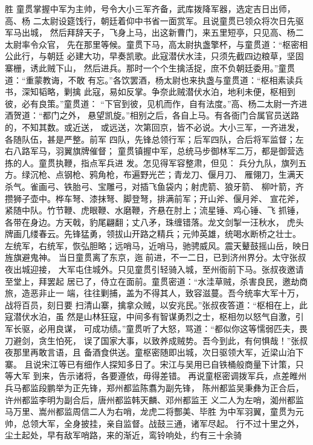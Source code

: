 胜
童贯掌握中军为主帅，号令大小三军齐备，武库拨降军器，选定吉日出师，高、杨
二太尉设筵饯行，朝廷着仰中书省一面赏军。且说童贯已领众将次日先驱军马出城，
然后拜辞天子，飞身上马，出这新曹门，来五里短亭，只见高、杨二太尉率令众官，
先在那里等候。童贯下马，高太尉执盏擎杯，与童贯道：“枢密相公此行，与朝廷
必建大功，早奏凯歌。此寇潜伏水洼，只须先截四边粮草，坚固寨栅，诱此贼下山，
然后进兵。那时一个个生擒活捉，庶不负朝廷委用。”童贯道：“重蒙教诲，不敢
有忘。”各饮罢酒，杨太尉也来执盏与童贯道：“枢相素读兵书，深知韬略，剿擒
此寇，易如反掌。争奈此贼潜伏水泊，地利未便，枢相到彼，必有良策。”童贯道：
“下官到彼，见机而作，自有法度。”高、杨二太尉一齐进酒贺道：“都门之外，
悬望凯旋。”相别之后，各自上马。有各衙门合属官员送路的，不知其数。或近送，
或远送，次第回京，皆不必说。大小三军，一齐进发，各随队伍，甚是严整。前军
四队，先锋总领行军；后军四队，合后将军监督；左右八路军马，羽翼旗牌催督；
童贯镇握中军，总统马步御林军二万，都是御营选拣的人。童贯执鞭，指点军兵进
发。怎见得军容整肃，但见：
兵分九队，旗列五方。绿沉枪、点钢枪、鸦角枪，布遍野光芒；青龙刀、偃月刀、
雁翎刀，生满天杀气。雀画弓、铁胎弓、宝雕弓，对插飞鱼袋内；射虎箭、狼牙箭、
柳叶箭，齐攒狮子壶中。桦车弩、漆抹弩、脚登弩，排满前军；开山斧、偃月斧、
宣花斧，紧随中队。竹节鞭、虎眼鞭、水磨鞭，齐悬在肘上；流星锤、鸡心锤、飞
抓锤，各带在身边。方天戟，豹尾翩翻；丈八矛，珠缠错落。龙文剑掣一汪秋水，
虎头牌画几缕春云。先锋猛勇，领拔山开路之精兵；元帅英雄，统喝水断桥之壮士。
左统军，右统军，恢弘胆略；远哨马，近哨马，驰骋威风。震天鼙鼓摇山岳，映日
旌旗避鬼神。
当日童贯离了东京，迤前进，不一二日，已到济州界分。太守张叔夜出城迎接，
大军屯住城外。只见童贯引轻骑入城，至州衙前下马。张叔夜邀请至堂上，拜罢起
居已了，侍立在面前。童贯密道：“水洼草贼，杀害良民，邀劫商旅，造恶非止一
端，往往剿捕，盖为不得其人，致容滋蔓。吾今统率大军十万，战将百员，刻日要
扫清山寨，擒拿众贼，以安兆民。”张叔夜答道：“枢相在上，此寇潜伏水泊，虽
然是山林狂寇，中间多有智谋勇烈之士，枢相勿以怒气自激，引军长驱，必用良谋，
可成功绩。”童贯听了大怒，骂道：“都似你这等懦弱匹夫，畏刀避剑，贪生怕死，
误了国家大事，以致养成贼势。吾今到此，有何惧哉！”张叔夜那里再敢言语，且
备酒食供送。童枢密随即出城，次日驱领大军，近梁山泊下寨。
且说宋江等已有细作人探知多日了。宋江与吴用已自铁桶般商量下计策，只等大军
到来，告示诸将，各要遵依，毋得差错。
再说童枢密调拨军兵，点差睢州兵马都监段鹏举为正先锋，郑州都监陈翥为副先锋，
陈州都监吴秉彝为正合后，许州都监李明为副合后，唐州都监韩天麟、邓州都监王
义二人为左哨，洳州都监马万里、嵩州都监周信二人为右哨，龙虎二将酆美、毕胜
为中军羽翼，童贯为元帅，总领大军，全身披挂，亲自监督。战鼓三通，诸军尽起。
行不过十里之外，尘土起处，早有敌军哨路，来的渐近，鸾铃响处，约有三十余骑
